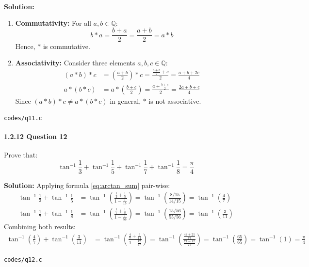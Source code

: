 \documentclass{article}
\begin{document}
\textbf{Solution:}
\begin{enumerate}
    \item \textbf{Commutativity:} For all $a, b \in \mathbb{Q}$:
    \begin{equation}
    b * a = \frac{b + a}{2} = \frac{a + b}{2} = a * b
    \end{equation}
    Hence, $*$ is commutative.
    \item \textbf{Associativity:} Consider three elements $a, b, c \in \mathbb{Q}$:
    \begin{align}
    (a * b) * c &= \left(\frac{a + b}{2}\right) * c = \frac{\frac{a + b}{2} + c}{2} = \frac{a + b + 2c}{4} \\
    a * (b * c) &= a * \left(\frac{b + c}{2}\right) = \frac{a + \frac{b + c}{2}}{2} = \frac{2a + b + c}{4}
    \end{align}
    Since $(a * b) * c \neq a * (b * c)$ in general, $*$ is not associative.
\end{enumerate}
\begin{tcolorbox}[colback=gray!10,colframe=black,width=\linewidth]
\texttt{codes/q11.c}
\end{tcolorbox}

\paragraph{1.2.12 Question 12}
Prove that:
\begin{equation}
\tan^{-1}\frac{1}{3} + \tan^{-1}\frac{1}{5} + \tan^{-1}\frac{1}{7} + \tan^{-1}\frac{1}{8} = \frac{\pi}{4}
\end{equation}

\textbf{Solution:} Applying formula \eqref{eq:arctan_sum} pair-wise:
\begin{align}
\tan^{-1}\frac{1}{3} + \tan^{-1}\frac{1}{5} &= \tan^{-1}\left(\frac{\frac{1}{3} + \frac{1}{5}}{1 - \frac{1}{15}}\right) = \tan^{-1}\left(\frac{8/15}{14/15}\right) = \tan^{-1}\left(\frac{4}{7}\right) \\
\tan^{-1}\frac{1}{7} + \tan^{-1}\frac{1}{8} &= \tan^{-1}\left(\frac{\frac{1}{7} + \frac{1}{8}}{1 - \frac{1}{56}}\right) = \tan^{-1}\left(\frac{15/56}{55/56}\right) = \tan^{-1}\left(\frac{3}{11}\right)
\end{align}
Combining both results:
\begin{align}
\tan^{-1}\left(\frac{4}{7}\right) + \tan^{-1}\left(\frac{3}{11}\right) &= \tan^{-1}\left(\frac{\frac{4}{7} + \frac{3}{11}}{1 - \frac{12}{77}}\right) = \tan^{-1}\left(\frac{\frac{44 + 21}{77}}{\frac{77 - 12}{77}}\right) = \tan^{-1}\left(\frac{65}{65}\right) = \tan^{-1}(1) = \frac{\pi}{4}
\end{align}
\begin{tcolorbox}[colback=gray!10,colframe=black,width=\linewidth]
\texttt{codes/q12.c}
\end{tcolorbox}
\end{document}
